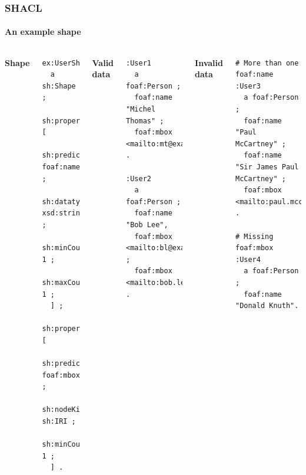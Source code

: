 \documentclass{beamer}
\begin{document}
\begin{frame}[fragile]
  \frametitle{SHACL}
  \framesubtitle{An example shape}

  \begin{columns}[t]

    \textbf{Shape}

    \begin{Verbatim}[fontsize=\footnotesize]
ex:UserShape
  a sh:Shape ;
  sh:property [
    sh:predicate foaf:name ;
    sh:datatype xsd:string ;
    sh:minCount 1 ;
    sh:maxCount 1 ;
  ] ;
  sh:property [
    sh:predicate foaf:mbox ;
    sh:nodeKind sh:IRI ;
    sh:minCount 1 ;
  ] .
    \end{Verbatim}

    \pause


    \textbf{Valid data}

    \begin{Verbatim}[fontsize=\tiny]
:User1
  a foaf:Person ;
  foaf:name "Michel Thomas" ;
  foaf:mbox <mailto:mt@example.org> .

:User2
  a foaf:Person ;
  foaf:name "Bob Lee",
  foaf:mbox <mailto:bl@example.org> ;
  foaf:mbox <mailto:bob.lee@example.org> .
    \end{Verbatim}

    \textbf{Invalid data}

    \begin{Verbatim}[fontsize=\tiny, formatcom=\color{red}]
# More than one foaf:name
:User3
  a foaf:Person ;
  foaf:name "Paul McCartney" ;
  foaf:name "Sir James Paul McCartney" ;
  foaf:mbox <mailto:paul.mccartney@example.org> .

# Missing foaf:mbox
:User4
  a foaf:Person ;
  foaf:name "Donald Knuth".
    \end{Verbatim}
  \end{columns}
\end{frame}
\end{document}

